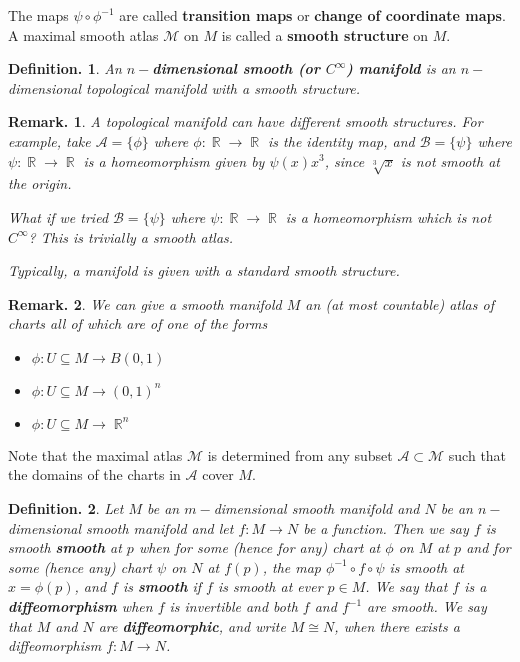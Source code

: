 \documentclass[11pt, a4paper]{memoir}
\DeclareMathOperator{\R}{{\mathbb{R}}}
\theoremstyle{change}
\theoremstyle{plain}
\theoremstyle{nonumberplain}
\newtheorem{definition}{Definition.}
\newtheorem{remark}{Remark.}
\numberwithin{equation}{section}
\begin{document}
The maps $\psi\circ\phi^{-1}$ are called \textbf{transition maps} or \textbf{change of coordinate maps}.
A maximal smooth atlas $\mathcal{M}$ on $M$ is called a \textbf{smooth structure} on $M$.
\begin{definition}
    An \textbf{$n-$dimensional smooth (or $C^\infty$) manifold} is an $n-$dimensional topological manifold with a smooth structure.
\end{definition}
\begin{remark}
    A topological manifold can have different smooth structures.
    For example, take $\mathcal{A}=\{\phi\}$ where $\phi:\R\to\R$ is the identity map, and $\mathcal{B}=\{\psi\}$ where $\psi:\R\to\R$ is a homeomorphism given by $\psi(x)x^3$, since $\sqrt[3]{x}$ is not smooth at the origin.

    What if we tried $\mathcal{B}=\{\psi\}$ where $\psi:\R\to\R$ is a homeomorphism which is not $C^\infty$?
    This is trivially a smooth atlas.

    Typically, a manifold is given with a standard smooth structure.
\end{remark}
\begin{remark}
    We can give a smooth manifold $M$ an (at most countable) atlas of charts all of which are of one of the forms
    \begin{itemize}[nl]
        \item $\phi:U\subseteq M\to B(0,1)$
        \item $\phi:U\subseteq M\to (0,1)^n$
        \item $\phi:U\subseteq M\to\R^n$
    \end{itemize}
\end{remark}
Note that the maximal atlas $\mathcal{M}$ is determined from any subset $\mathcal{A}\subset\mathcal{M}$ such that the domains of the charts in $\mathcal{A}$ cover $M$.
\begin{definition}
    Let $M$ be an $m-$dimensional smooth manifold and $N$ be an $n-$dimensional smooth manifold and let $f:M\to N$ be a function.
    Then we say $f$ is smooth \textbf{smooth} at $p$ when for some (hence for any) chart at $\phi$ on $M$ at $p$ and for some (hence any) chart $\psi$ on $N$ at $f(p)$, the map $\phi^{-1}\circ f\circ\psi$ is smooth at $x=\phi(p)$, and $f$ is \textbf{smooth} if $f$ is smooth at ever $p\in M$.
    We say that $f$ is a \textbf{diffeomorphism} when $f$ is invertible and both $f$ and $f^{-1}$ are smooth.
    We say that $M$ and $N$ are \textbf{diffeomorphic}, and write $M\cong N$, when there exists a diffeomorphism $f:M\to N$.
\end{definition}
\end{document}
